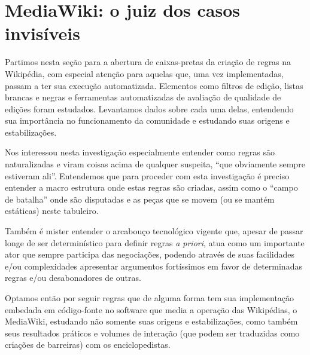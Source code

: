 \section{MediaWiki: o juiz dos casos invisíveis}

Partimos nesta seção para a abertura de caixas-pretas da criação de regras na Wikipédia, com especial atenção para aquelas que, uma vez implementadas, passam a ter sua execução automatizada. Elementos como filtros de edição, listas brancas e negras e ferramentas automatizadas de avaliação de qualidade de edições foram estudados. Levantamos dados sobre cada uma delas, entendendo sua importância no funcionamento da comunidade e estudando suas origens e estabilizações.

Nos interessou nesta investigação especialmente entender como regras são naturalizadas e viram coisas acima de qualquer suspeita, ``que obviamente sempre estiveram ali''. Entendemos que para proceder com esta investigação é preciso entender a macro estrutura onde estas regras são criadas, assim como o ``campo de batalha'' onde são disputadas e as peças que se movem (ou se mantém estáticas) neste tabuleiro.

Também é mister entender o arcabouço tecnológico vigente que, apesar de passar longe de ser determinístico para definir regras \textit{a priori}, atua como um importante ator que sempre participa das negociações, podendo através de suas facilidades e/ou complexidades apresentar argumentos fortíssimos em favor de determinadas regras e/ou desabonadores de outras.

Optamos então por seguir regras que de alguma forma tem sua implementação embedada em código-fonte no software que media a operação das Wikipédias, o MediaWiki, estudando não somente suas origens e estabilizações, como também seus resultados práticos e volumes de interação (que podem ser traduzidas como criações de barreiras) com os enciclopedistas.


%


%
